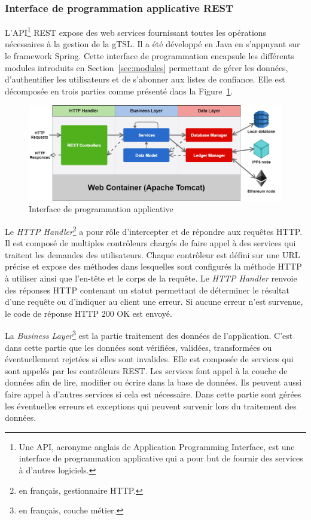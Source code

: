 \documentclass{tnreport}
\begin{document}
\subsubsection{Interface de programmation applicative REST}

L'API\footnote{Une API, acronyme anglais de Application Programming Interface, est une interface de programmation applicative qui a pour but de fournir des services à d'autres logiciels.} REST expose des web services fournissant toutes les opérations nécessaires à la gestion de la gTSL. Il a été développé en Java en s'appuyant sur le framework Spring. Cette interface de programmation encapsule les différents modules introduits en Section~\ref{sec:modules} permettant de gérer les données, d'authentifier les utilisateurs et de s'abonner aux listes de confiance. Elle est décomposée en trois parties comme présenté dans la Figure~\ref{fig:rest-api}.

\begin{figure}[h]
	\centering
	\includegraphics[scale=0.52]{figures/rest-api}
	\caption{Interface de programmation applicative}
	\label{fig:rest-api}
\end{figure}

Le \textit{HTTP Handler}\footnote{en français, gestionnaire HTTP.} a pour rôle d'intercepter et de répondre aux requêtes HTTP. Il est composé de multiples contrôleurs chargés de faire appel à des services qui traitent les demandes des utilisateurs. Chaque contrôleur est défini sur une URL précise et expose des méthodes dans lesquelles sont configurés la méthode HTTP à utiliser ainsi que l'en-tête et le corps de la requête. Le \textit{HTTP Handler} renvoie des réponses HTTP contenant un statut permettant de déterminer le résultat d'une requête ou d'indiquer au client une erreur. Si aucune erreur n'est survenue, le code de réponse HTTP 200 OK est envoyé.

La \textit{Business Layer}\footnote{en français, couche métier.} est la partie traitement des données de l'application. C'est dans cette partie que les données sont vérifiées, validées, transformées ou éventuellement rejetées si elles sont invalides. Elle est composée de services qui sont appelés par les contrôleurs REST. Les services font appel à la couche de données afin de lire, modifier ou
écrire dans la base de données. Ils peuvent aussi faire appel à d'autres services si cela est nécessaire. Dans cette partie sont gérées les éventuelles erreurs et exceptions qui peuvent survenir lors du traitement des données.
\end{document}
